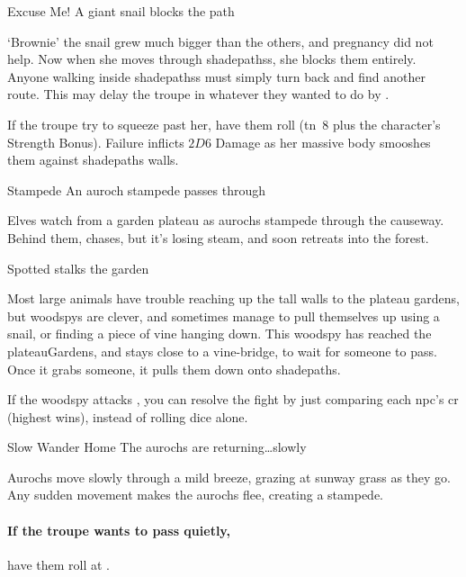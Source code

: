 
{Excuse Me!}%
{A giant snail blocks the path}%

`Brownie' the snail grew much bigger than the others, and pregnancy did not help.
Now when she moves through \glspl{shadepaths}, she blocks them entirely.
Anyone walking inside \glspl{shadepaths} must simply turn back and find another route.
This may delay the troupe in whatever they wanted to do by .

If the troupe try to squeeze past her, have them roll  (\gls{tn}~8 plus the character's Strength Bonus).
Failure inflicts $2D6$ Damage as her massive body smooshes them against \gls{shadepaths} walls.

{Stampede}%
{An auroch stampede passes through}%

Elves watch from a garden plateau as aurochs stampede through the causeway.
Behind them,  chases, but it's losing steam, and soon retreats into the forest.

{ Spotted}%
{ stalks the garden}%

Most large animals have trouble reaching up the tall walls to the plateau gardens, but \glspl{woodspy} are clever, and sometimes manage to pull themselves up using a snail, or finding a piece of vine hanging down.
This \gls{woodspy} has reached the \gls{plateauGardens}, and stays close to a vine-bridge, to wait for someone to pass.
Once it grabs someone, it pulls them down onto \gls{shadepaths}.

If the \gls{woodspy} attacks , you can resolve the fight by just comparing each \gls{npc}'s \gls{cr} (highest wins), instead of rolling dice alone.

{Slow Wander Home}%
{The aurochs are returning\ldots slowly}%

Aurochs move slowly through a mild breeze, grazing at \gls{sunway} grass as they go.
Any sudden movement makes the aurochs flee, creating a stampede.

\paragraph{If the troupe wants to pass quietly,}
have them roll  at \tn[8].


